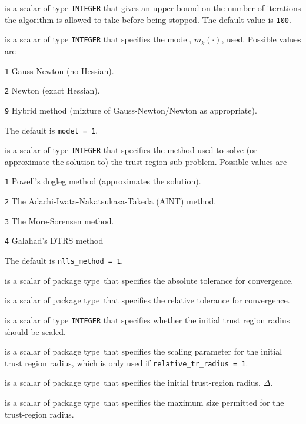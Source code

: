 \documentclass{spec}
\newcommand{\scalarinteger}{is a scalar of type {\tt INTEGER} }
\newcommand{\scalarreal}{is a scalar of package type\ }
\begin{document}
\begin{description}

 \scalarinteger that gives an upper bound on the number
of iterations the algorithm is allowed to take before being stopped.  The default value is {\tt 100}.

 \scalarinteger that specifies the model, $m_k(\cdot)$, used.  Possible values are 
\begin{description}
  \item{\tt 1} Gauss-Newton (no Hessian).
  \item{\tt 2} Newton (exact Hessian).
  \item{\tt 9} Hybrid method (mixture of Gauss-Newton/Newton as appropriate).
\end{description}
The default is {\tt model = 1}.

 \scalarinteger that specifies the method used to solve 
(or approximate the solution to) the trust-region sub problem.  Possible values are
\begin{description}
  \item{\tt 1} Powell's dogleg method (approximates the solution).
  \item{\tt 2} The Adachi-Iwata-Nakatsukasa-Takeda (AINT) method.
  \item{\tt 3} The More-Sorensen method.
  \item{\tt 4} Galahad's DTRS method
\end{description}
The default is {\tt nlls\_method = 1}.

 \scalarreal that specifies the absolute tolerance for convergence.

 \scalarreal that specifies the relative tolerance for convergence.

 \scalarinteger that specifies whether the initial trust region 
radius should be scaled.

 \scalarreal that specifies the scaling parameter for the initial trust region radius, which is only used if {\tt relative\_tr\_radius = 1}.

 \scalarreal that specifies the initial trust-region radius, $\Delta$.

 \scalarreal that specifies the maximum size permitted for the trust-region radius.


\end{description}
\end{document}
